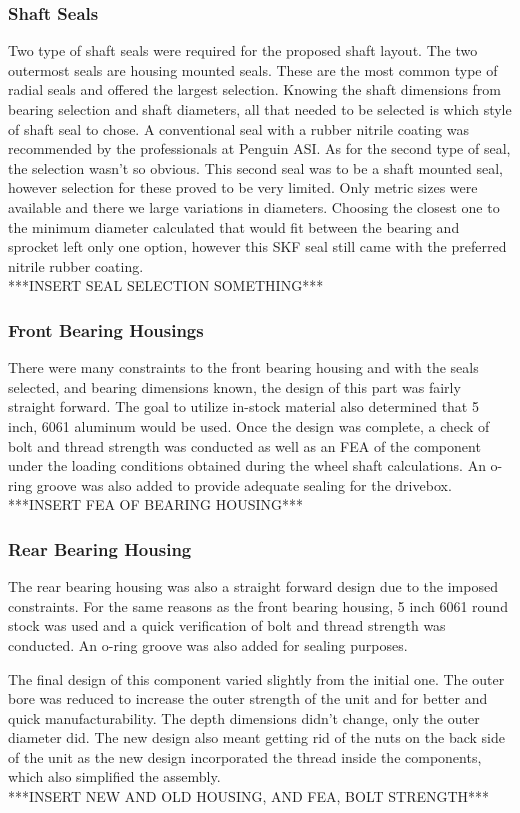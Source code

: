 \subsubsection{Shaft Seals}
Two type of shaft seals were required for the proposed shaft layout. The two outermost seals are housing mounted seals. These are the most common type of radial seals and offered the largest selection. Knowing the shaft dimensions from bearing selection and shaft diameters, all that needed to be selected is which style of shaft seal to chose. A conventional seal with a rubber nitrile coating was recommended by the professionals at Penguin ASI. As for the second type of seal, the selection wasn't so obvious. This second seal was to be a shaft mounted seal, however selection for these proved to be very limited. Only metric sizes were available and there we large variations in diameters. Choosing the closest one to the minimum diameter calculated that would fit between the bearing and sprocket left only one option, however this SKF seal still came with the preferred nitrile rubber coating.
\\
***INSERT SEAL SELECTION SOMETHING***
\subsubsection{Front Bearing Housings}
There were many constraints to the front bearing housing and with the seals selected, and bearing dimensions known, the design of this part was fairly straight forward. The goal to utilize in-stock material also determined that 5 inch, 6061 aluminum would be used. Once the design was complete, a check of bolt and thread strength was conducted as well as an FEA of the component under the loading conditions obtained during the wheel shaft calculations. An o-ring groove was also added to provide adequate sealing for the drivebox.
\\
***INSERT FEA OF BEARING HOUSING***
\subsubsection{Rear Bearing Housing}
The rear bearing housing was also a straight forward design due to the imposed constraints. For the same reasons as the front bearing housing, 5 inch 6061 round stock was used and a quick verification of bolt and thread strength was conducted. An o-ring groove was also added for sealing purposes.

The final design of this component varied slightly from the initial one. The outer bore was reduced to increase the outer strength of the unit and for better and quick manufacturability. The depth dimensions didn't change, only the outer diameter did. The new design also meant getting rid of the nuts on the back side of the unit as the new design incorporated the thread inside the components, which also simplified the assembly.
\\
***INSERT NEW AND OLD HOUSING, AND FEA, BOLT STRENGTH*** 

